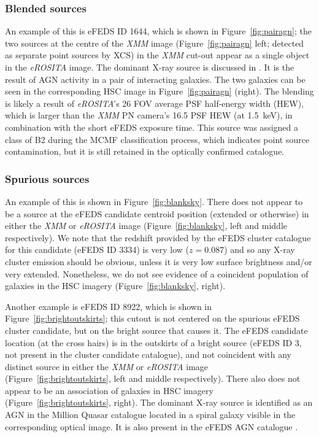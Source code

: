 \documentclass[fleqn,usenatbib]{mnras}
\begin{document}

\subsubsection{Blended sources}
\label{subsubsec:blended}

An example of this is eFEDS ID 1644, which is shown in Figure~\ref{fig:pairagn}; the two sources at the centre of the {\em XMM} image (Figure~\ref{fig:pairagn} left; detected as separate point sources by XCS) in the {\em XMM} cut-out appear as a single object in the {\em eROSITA} image. The dominant X-ray source is discussed in \cite{agnpair}. It is the result of AGN activity in a pair of interacting galaxies. The two galaxies can be seen in the corresponding HSC image in Figure~\ref{fig:pairagn} (right). The blending is likely a result of {\em eROSITA}'s 26{\arcsec} FOV average PSF half-energy width (HEW), which is larger than the {\em XMM} PN camera's 16.5{\arcsec} PSF HEW (at 1.5~keV), in combination with the short eFEDS exposure time. This source was assigned a class of B2 during the MCMF classification process, which indicates point source contamination, but it is still retained in the optically confirmed catalogue.

\subsubsection{Spurious sources}
\label{subsubsec:spurious}
An example of this is shown in Figure~\ref{fig:blanksky}. There does not appear to be a source at the eFEDS candidate centroid position (extended or otherwise) in either the {\em XMM} or {\em eROSITA} image (Figure~\ref{fig:blanksky}, left and middle respectively). We note that the redshift provided by the eFEDS cluster catalogue for this candidate (eFEDS ID 3334) is very low ($z{=}0.087$) and so any X-ray cluster emission should be obvious, unless it is very low surface brightness and/or very extended. Nonetheless, we do not see evidence of a coincident population of galaxies in the HSC imagery (Figure~\ref{fig:blanksky}, right). 

Another example is eFEDS ID 8922, which is shown in Figure~\ref{fig:brightoutskirts}; this cutout is not centered on the spurious eFEDS cluster candidate, but on the bright source that causes it. The eFEDS candidate location (at the cross hairs) is in the outskirts of a bright source (eFEDS ID 3, not present in the cluster candidate catalogue), and not coincident with any distinct source in either the {\em XMM} or {\em eROSITA} image (Figure~\ref{fig:brightoutskirts}, left and middle respectively). There also does not appear to be an association of galaxies in HSC imagery (Figure~\ref{fig:brightoutskirts}, right). The dominant X-ray source is identified as an AGN in the Million Quasar catalogue \citep{milliquas} located in a spiral galaxy visible in the corresponding optical image. It is also present in the eFEDS AGN catalogue \citep[][]{efedsagn}.
\end{document}
